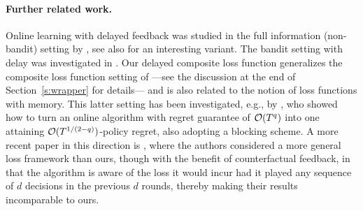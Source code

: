 \paragraph{Further related work. }
%
Online learning with delayed feedback was studied in the full
information (non-bandit) setting by
\citet{weinberger2002delayed,mesterharm2005line,langford2009slow,joulani2013online,quanrud2015online,khashabi2016adversarial,joulani2016delay,garrabrant2016asymptotic},
see also \citep{shamir2017online} for an interesting variant. The
bandit setting with delay was investigated in
\citep{neu2010online,joulani2013online,mandel2015queue,cgmm16,VernadeCP17,pike2017bandits}.
Our delayed composite loss function generalizes the composite loss
function setting of \citet{ddkp14} ---see the discussion at the end
of Section~\ref{s:wrapper} for details--- and is also related to the
notion of loss functions with memory. This latter setting has been
investigated, e.g., by \cite{adt12}, who showed how to turn an
online algorithm with regret guarantee of $\mathcal{O}(T^q)$ into one
attaining $\mathcal{O}(T^{ 1/(2-q)})$-policy regret, also adopting a
blocking scheme. A more recent paper in this direction is
\citep{ahm15}, where the authors considered a more general loss
framework than ours, though with the benefit of counterfactual
feedback, in that the algorithm is aware of the loss it would incur
had it played any sequence of $d$ decisions in the previous $d$
rounds, thereby making their results incomparable to ours.
